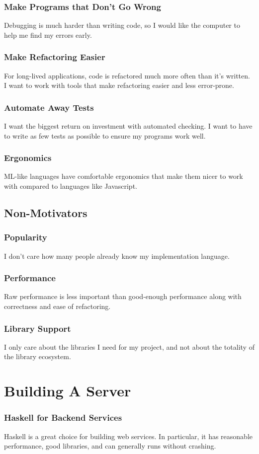 \documentclass{beamer}
\begin{document}
\begin{frame}
  \frametitle{Make Programs that Don't Go Wrong}
  Debugging is much harder than writing code, so I would like the
  computer to help me find my errors early.
\end{frame}

\begin{frame}
  \frametitle{Make Refactoring Easier}
  For long-lived applications, code is refactored much more often than
  it's written.  I want to work with tools that make refactoring
  easier and less error-prone.
\end{frame}

\begin{frame}
  \frametitle{Automate Away Tests}
  I want the biggest return on investment with automated checking.  I
  want to have to write as few tests as possible to ensure my programs
  work well.
\end{frame}

\begin{frame}
  \frametitle{Ergonomics}
  ML-like languages have comfortable ergonomics that make them nicer
  to work with compared to languages like Javascript.
\end{frame}

\subsection{Non-Motivators}

\begin{frame}
  \frametitle{Popularity}
  I don't care how many people already know my implementation language.
\end{frame}

\begin{frame}
  \frametitle{Performance}
  Raw performance is less important than good-enough performance along
  with correctness and ease of refactoring.
\end{frame}

\begin{frame}
  \frametitle{Library Support}
  I only care about the libraries I need for my project, and not about
  the totality of the library ecosystem.
\end{frame}

\section{Building A Server}

\begin{frame}
  \frametitle{Haskell for Backend Services}
  Haskell is a great choice for building web services.  In particular,
  it has reasonable performance, good libraries, and can generally
  runs without crashing.
\end{frame}
\end{document}

